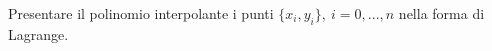 Presentare il polinomio interpolante i punti $\{ x_i, y_i\}, \ 
i=0,...,n$ nella forma di Lagrange.

